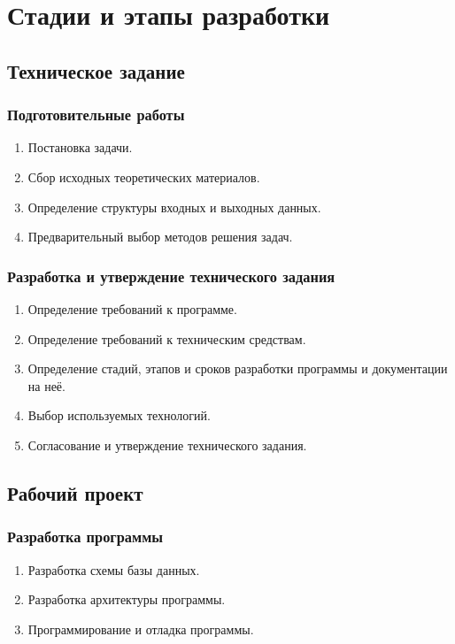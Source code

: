 \documentclass[a4paper,12pt,reqno]{article}
\begin{document}
    \newpage


    \section{Стадии и этапы разработки}

    \subsection{Техническое задание}

    \subsubsection{Подготовительные работы}
    \begin{enumerate}
        \item Постановка задачи.
        \item Сбор исходных теоретических материалов.
        \item Определение структуры входных и выходных данных.
        \item Предварительный выбор методов решения задач.
    \end{enumerate}

    \subsubsection{Разработка и утверждение технического задания}
    \begin{enumerate}
        \item Определение требований к программе.
        \item Определение требований к техническим средствам.
        \item Определение стадий, этапов и сроков разработки программы и документации на неё.
        \item Выбор используемых технологий.
        \item Согласование и утверждение технического задания.
    \end{enumerate}

    \subsection{Рабочий проект}

    \subsubsection{Разработка программы}
    \begin{enumerate}
        \item Разработка схемы базы данных.
        \item Разработка архитектуры программы.
        \item Программирование и отладка программы.
    \end{enumerate}
\end{document}
